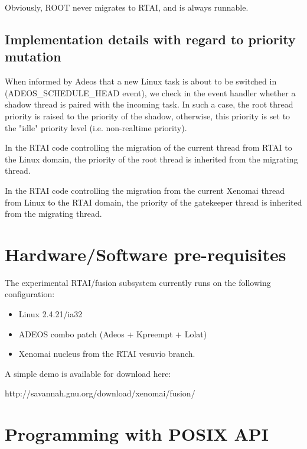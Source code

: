 Obviously, ROOT never migrates to RTAI, and is always runnable.


\subsection{Implementation details with regard to priority mutation}

When informed by Adeos that a new Linux task is about to be switched
in (ADEOS\_SCHEDULE\_HEAD event), we check in the event handler whether
a shadow thread is paired with the incoming task.  In such a case, the
root thread priority is raised to the priority of the shadow,
otherwise, this priority is set to the "idle" priority level
(i.e. non-realtime priority).

In the RTAI code controlling the migration of the current thread
from RTAI to the Linux domain, the priority of the root thread is
inherited from the migrating thread.

In the RTAI code controlling the migration from the current Xenomai
thread from Linux to the RTAI domain, the priority of the gatekeeper
thread is inherited from the migrating thread.

\section{Hardware/Software pre-requisites}

The experimental RTAI/fusion subsystem currently runs on the following
configuration:

\begin{itemize}

\item Linux 2.4.21/ia32
\item ADEOS combo patch (Adeos + Kpreempt + Lolat)
\item Xenomai nucleus from the RTAI vesuvio branch.

\end{itemize}

A simple demo is available for download here:

\centerline{http://savannah.gnu.org/download/xenomai/fusion/}


\section{Programming with POSIX API}
